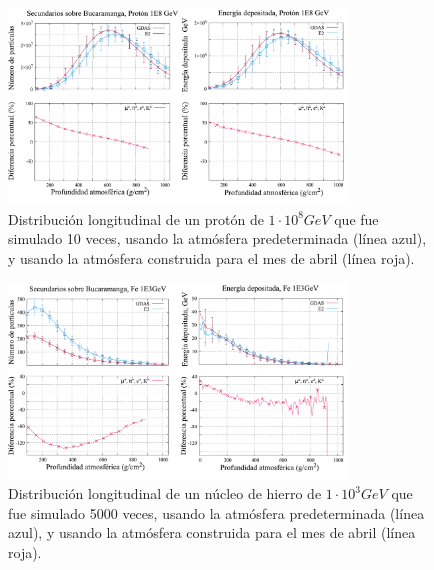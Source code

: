 \begin{figure}[htb!]
\centering
\includegraphics[width=0.8\textwidth]{images/proton_1E8.pdf}
\caption[Distribución longitudinal de un protón de $1\cdot 10^{8}$ GeV.]{Distribución longitudinal de un protón de $1\cdot 10^{8} GeV$ que fue simulado 10 veces, usando la atmósfera predeterminada (línea azul), y usando la atmósfera construida para el mes de abril (línea roja). }
\label{fig:fig26b}
\end{figure}


\begin{figure}[htb!]
\centering
\includegraphics[width=0.8\textwidth]{images/fe_1E3.pdf}
\caption[Distribución longitudinal de un núcleo de hierro de $1\cdot 10^{3}$ GeV.]{Distribución longitudinal de un núcleo de hierro de $1\cdot 10^{3} GeV$ que fue simulado 5000 veces, usando la atmósfera predeterminada (línea azul), y usando la atmósfera construida para el mes de abril (línea roja). }
\label{fig:fig27}
\end{figure}

